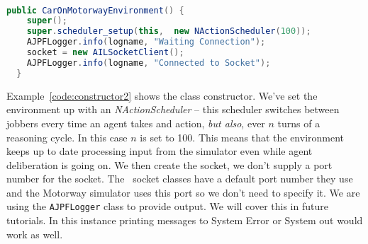 \begin{ourexample}
\label{code:constructor2} \quad \\
\begin{lstlisting}[basicstyle=\sffamily,language=Java,style=easslisting]
  public CarOnMotorwayEnvironment() {
    super();
    super.scheduler_setup(this,  new NActionScheduler(100));
    AJPFLogger.info(logname, "Waiting Connection");
    socket = new AILSocketClient();
    AJPFLogger.info(logname, "Connected to Socket");
  }
\end{lstlisting}
\end{ourexample}
Example~\ref{code:constructor2} shows the class constructor.  We've set the environment up with an \emph{NActionScheduler} -- this scheduler switches between jobbers every time an agent takes and action, \emph{but also}, ever $n$ turns of a reasoning cycle.  In this case $n$ is set to 100.  This means that the environment keeps up to date processing input from the simulator even while agent deliberation is going on.  We then create the socket, we don't supply a port number for the socket.  The \ail\ socket classes have a default port number they use and the Motorway simulator uses this port so we don't need to specify it.  We are using the \texttt{AJPFLogger} class to provide output.  We will cover this in future tutorials.  In this instance printing messages to System Error or System out would work as well.

